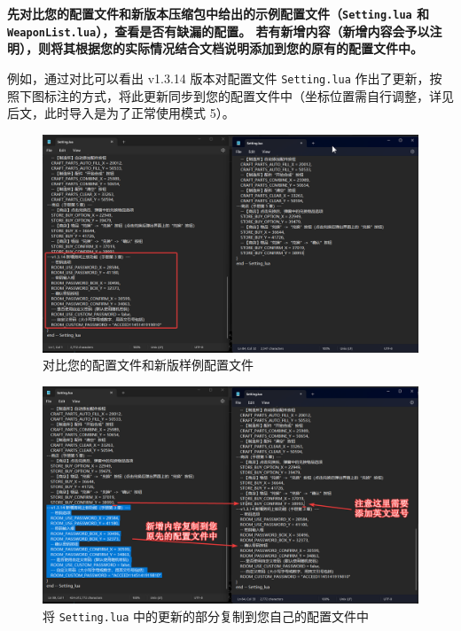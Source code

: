 \textbf{\color{red} 先对比您的配置文件和新版本压缩包中给出的示例配置文件（\lstinline{Setting.lua} 和 \lstinline{WeaponList.lua}），查看是否有缺漏的配置。
若有新增内容（新增内容会予以注明），则将其根据您的实际情况结合文档说明添加到您的原有的配置文件中。}

例如，通过对比可以看出 v1.3.14 版本对配置文件 \lstinline{Setting.lua} 作出了更新，按照下图标注的方式，将此更新同步到您的配置文件中（坐标位置需自行调整，详见后文，此时导入是为了正常使用模式 5）。

\begin{figure}[H]
    \Centering
    \includegraphics[width=\textwidth]{docs/assets/update/replace_01.png}
    \caption{对比您的配置文件和新版样例配置文件}
\end{figure}

\begin{figure}[H]
    \Centering
    \includegraphics[width=\textwidth]{docs/assets/update/replace_02.png}
    \caption{将 \lstinline{Setting.lua} 中的更新的部分复制到您自己的配置文件中}
\end{figure}

